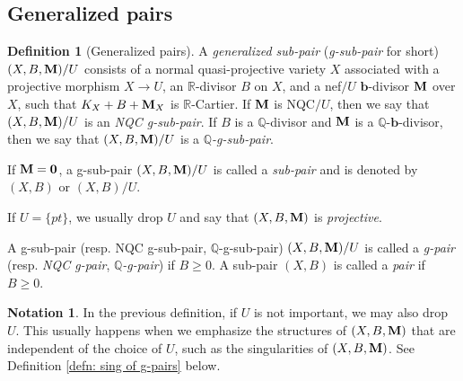 \documentclass[11pt]{amsart}
\numberwithin{equation}{section}
\newcommand{\bb}{\bm{b}}
\newcommand{\Mm}{{\bf{M}}}
\newcommand{\Qq}{\mathbb{Q}}
\newcommand{\Rr}{\mathbb{R}}
\theoremstyle{definition}
\newtheorem{defn}[thm]{Definition}
\theoremstyle{definition}
\newtheorem{nota}[thm]{Notation}
\theoremstyle{definition}
\begin{document}
\subsection{Generalized pairs}

\begin{defn}[Generalized pairs]\label{defn: g-pairs}
A \emph{generalized sub-pair} (\emph{g-sub-pair} for short) $(X,B,\Mm)/U$ consists of a normal quasi-projective variety $X$ associated with a projective morphism $X\rightarrow U$, an $\Rr$-divisor $B$ on $X$, and a nef$/U$ $\bb$-divisor $\Mm$ over $X$, such that $K_X+B+\Mm_X$ is $\Rr$-Cartier. If $\Mm$ is NQC$/U$, then we say that $(X,B,\Mm)/U$ is an \emph{NQC g-sub-pair}. If $B$ is a $\Qq$-divisor and $\Mm$ is a $\Qq$-$\bb$-divisor, then we say that $(X,B,\Mm)/U$ is a \emph{$\Qq$-g-sub-pair}.

If $\Mm=\bm{0}$, a g-sub-pair $(X,B,\Mm)/U$ is called a \emph{sub-pair} and is denoted by $(X,B)$ or $(X,B)/U$. 

If $U=\{pt\}$, we usually drop $U$ and say that $(X,B,\Mm)$ is \emph{projective}.

A g-sub-pair (resp. NQC g-sub-pair, $\Qq$-g-sub-pair) $(X,B,\Mm)/U$ is called a \emph{g-pair} (resp. \emph{NQC g-pair}, \emph{$\Qq$-g-pair}) if $B\geq 0$. A sub-pair $(X,B)$ is called a \emph{pair} if $B\geq 0$.
\end{defn}

\begin{nota}
In the previous definition, if $U$ is not important, we may also drop $U$. This usually happens when we emphasize the structures of $(X,B,\Mm)$ that are independent of the choice of $U$, such as the singularities of $(X,B,\Mm)$. See Definition \ref{defn: sing of g-pairs} below.
\end{nota}
\end{document}
